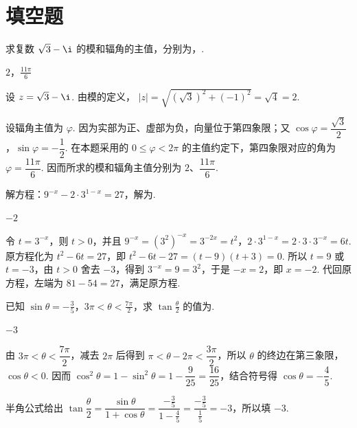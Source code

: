 \documentclass[UTF8,a4paper,oneside,11pt]{ctexbook}
\begin{document}
\section{填空题}

\begin{problem}
求复数 \(\sqrt{3} - \i\) 的模和辐角的主值，分别为\fillinblank{}，\fillinblank{}.
\end{problem}

\begin{answer}
\(2\)，\(\frac{11\pi}{6}\)
\end{answer}

\begin{solution}
设 \(z=\sqrt3-\i\). 由模的定义，
\(\lvert z\rvert=\sqrt{\left(\sqrt3\right)^2+(-1)^2}=\sqrt4=2\).

设辐角主值为 \(\varphi\). 因为实部为正、虚部为负，向量位于第四象限；又
\(\cos\varphi=\dfrac{\sqrt3}{2}\)，\(\sin\varphi=-\dfrac12\). 在本题采用的 \(0\leq\varphi<2\pi\) 的主值约定下，第四象限对应的角为 \(\varphi=\dfrac{11\pi}{6}\). 因而所求的模和辐角主值分别为 \(2\)、\(\dfrac{11\pi}{6}\).
\end{solution}

\begin{problem}
解方程：\(9^{-x} - 2 \cdot 3^{1-x} = 27\)，解为\fillinblank{}.
\end{problem}

\begin{answer}
\(-2\)
\end{answer}

\begin{solution}
令 \(t=3^{-x}\)，则 \(t>0\)，并且
\(9^{-x}=\left(3^2\right)^{-x}=3^{-2x}=t^2\)，\(2\cdot3^{1-x}=2\cdot3\cdot3^{-x}=6t\). 原方程化为
\(t^2-6t=27\)，即
\(t^2-6t-27=(t-9)(t+3)=0\). 所以 \(t=9\) 或 \(t=-3\)，由 \(t>0\) 舍去 \(-3\)，得到 \(3^{-x}=9=3^2\)，于是 \(-x=2\)，即 \(x=-2\). 代回原方程，左端为 \(81-54=27\)，满足原方程.
\end{solution}

\begin{problem}
已知 \(\sin\theta = -\frac{3}{5}\)，\(3\pi < \theta < \frac{7\pi}{2}\)，求 \(\tan\frac{\theta}{2}\) 的值为\fillinblank{}.
\end{problem}

\begin{answer}
\(-3\)
\end{answer}

\begin{solution}
由 \(3\pi<\theta<\dfrac{7\pi}{2}\)，减去 \(2\pi\) 后得到
\(\pi<\theta-2\pi<\dfrac{3\pi}{2}\)，所以 \(\theta\) 的终边在第三象限，\(\cos\theta<0\). 因而
\(\cos^2\theta=1-\sin^2\theta=1-\dfrac9{25}=\dfrac{16}{25}\)，结合符号得 \(\cos\theta=-\dfrac45\).

半角公式给出
\(\tan\dfrac\theta2=\dfrac{\sin\theta}{1+\cos\theta}=\dfrac{-\frac35}{1-\frac45}=\dfrac{-\frac35}{\frac15}=-3\)，所以填 \(-3\).
\end{solution}
\end{document}
